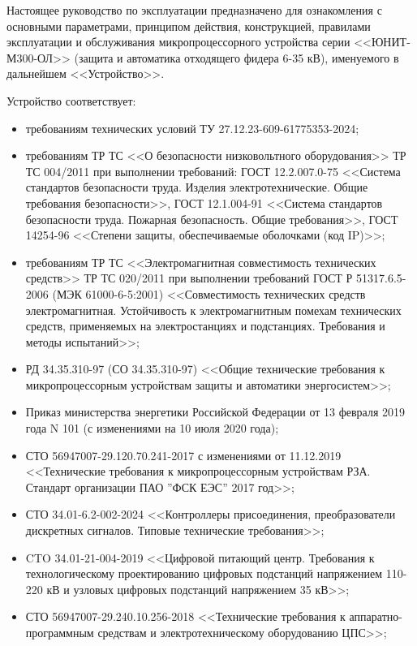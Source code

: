 \par
Настоящее руководство по эксплуатации предназначено для ознакомления с основными параметрами, принципом действия, конструкцией, правилами эксплуатации и обслуживания микропроцессорного устройства серии <<ЮНИТ-М300-ОЛ>> (защита и автоматика отходящего фидера 6-35 кВ), именуемого в дальнейшем <<Устройство>>.

\par
Устройство соответствует:
\begin{itemize}
\item требованиям технических условий ТУ 27.12.23-609-61775353-2024;
\item требованиям ТР ТС <<О безопасности низковольтного оборудования>> ТР ТС 004/2011 при выполнении требований: ГОСТ 12.2.007.0-75 <<Система стандартов безопасности труда. Изделия электротехнические. Общие требования безопасности>>, ГОСТ 12.1.004-91 <<Система стандартов безопасности труда. Пожарная безопасность. Общие требования>>, ГОСТ 14254-96 <<Степени защиты, обеспечиваемые оболочками (код IP)>>; 
\item требованиям ТР ТС <<Электромагнитная совместимость технических средств>> ТР ТС 020/2011 при выполнении требований ГОСТ Р 51317.6.5-2006 (МЭК 61000-6-5:2001) <<Совместимость технических средств электромагнитная. Устойчивость к электромагнитным помехам технических средств, применяемых на электростанциях и подстанциях. Требования и методы испытаний>>;
\item РД 34.35.310-97 (СО 34.35.310-97) <<Общие технические требования к микропроцессорным устройствам защиты и автоматики энергосистем>>;
\item Приказ министерства энергетики Российской Федерации от 13 февраля 2019 года N 101 (с изменениями на 10 июля 2020 года);
\item СТО 56947007-29.120.70.241-2017 с изменениями от 11.12.2019 <<Технические требования к микропроцессорным устройствам РЗА. Стандарт организации ПАО ''ФСК ЕЭС'' 2017 год>>;
\item СТО 34.01-6.2-002-2024 <<Контроллеры присоединения, преобразователи дискретных сигналов. Типовые технические требования>>;
\item CTO 34.01-21-004-2019 <<Цифровой питающий центр. Требования к технологическому проектированию цифровых подстанций напряжением 110-220 кВ и узловых цифровых подстанций напряжением 35 кВ>>;
\item СТО 56947007-29.240.10.256-2018 <<Технические требования к аппаратно-программным средствам и электротехническому оборудованию ЦПС>>;

\end{itemize}
